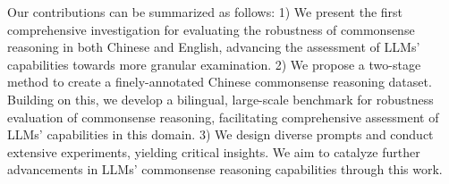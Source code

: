 Our contributions can be summarized as follows:
1) We present the first comprehensive investigation for evaluating the robustness of commonsense reasoning in both Chinese and English, advancing the assessment of LLMs' capabilities towards more granular examination.
2) We propose a two-stage method to create a finely-annotated Chinese commonsense reasoning dataset. Building on this, we develop a bilingual, large-scale benchmark for robustness evaluation of commonsense reasoning, facilitating comprehensive assessment of LLMs' capabilities in this domain.
3) We design diverse prompts and conduct extensive experiments, yielding critical insights. 
We aim to catalyze further advancements in LLMs' commonsense reasoning capabilities through this work.



